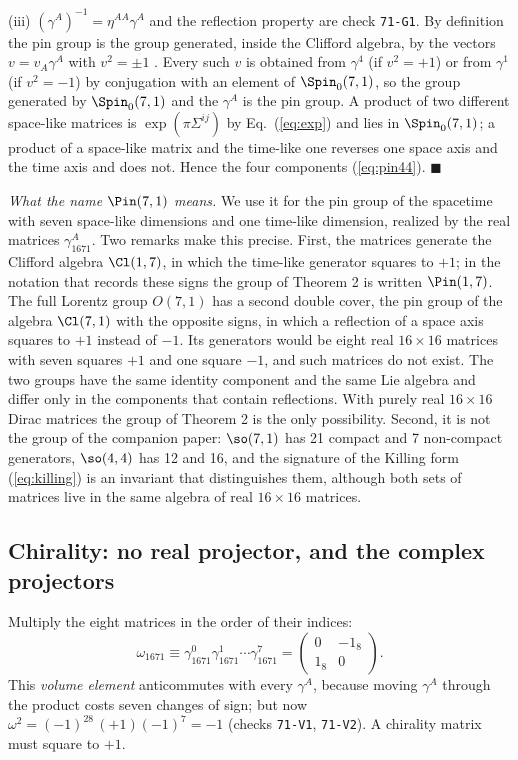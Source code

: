 (iii) $(\gamma^A)^{-1}=\eta^{AA}\gamma^A$ and the reflection property are check \texttt{71-G1}. By
definition the pin group is the group generated, inside the Clifford algebra, by the vectors
$v=v_A\gamma^A$ with $v^2=\pm1$ \cite{AtiyahBottShapiro1964,LawsonMichelsohn1989}. Every such $v$ is
obtained from $\gamma^4$ (if $v^2=+1$) or from $\gamma^1$ (if $v^2=-1$) by conjugation with an element
of $\Spin_0(7,1)$, so the group generated by $\Spin_0(7,1)$ and the $\gamma^A$ is the pin group. A
product of two different space-like matrices is $\exp(\pi\Sigma^{ij})$ by Eq.~(\ref{eq:exp}) and lies
in $\Spin_0(7,1)$; a product of a space-like matrix and the time-like one reverses one space axis and
the time axis and does not. Hence the four components (\ref{eq:pin44}). $\blacksquare$

\emph{What the name $\Pin(7,1)$ means.} We use it for the pin group of the spacetime with seven
space-like dimensions and one time-like dimension, realized by the real matrices $\gamma_{1671}^A$.
Two remarks make this precise. First, the matrices generate the Clifford algebra $\Cl(1,7)$, in which
the time-like generator squares to $+1$; in the notation that records these signs the group of
Theorem 2 is written $\Pin(1,7)$. The full Lorentz group $O(7,1)$ has a second double cover, the pin
group of the algebra $\Cl(7,1)$ with the opposite signs, in which a reflection of a space axis squares
to $+1$ instead of $-1$. Its generators would be eight real $16\times16$ matrices with seven squares
$+1$ and one square $-1$, and such matrices do not exist. The two groups have the same identity
component and the same Lie algebra and differ only in the components that contain reflections. With
purely real $16\times16$ Dirac matrices the group of Theorem 2 is the only possibility. Second, it is
not the group of the companion paper: $\so(7,1)$ has 21 compact and 7 non-compact generators,
$\so(4,4)$ has 12 and 16, and the signature of the Killing form (\ref{eq:killing}) is an invariant
that distinguishes them, although both sets of matrices live in the same algebra of real
$16\times16$ matrices.

\subsection{Chirality: no real projector, and the complex projectors}
\label{sec:chirality}

Multiply the eight matrices in the order of their indices:
\begin{equation}
\omega_{1671}\equiv\gamma_{1671}^0\gamma_{1671}^1\cdots\gamma_{1671}^7=\begin{pmatrix}0&-1_8\\1_8&0\end{pmatrix}.
\label{eq:omega}
\end{equation}
This \emph{volume element} anticommutes with every $\gamma^A$, because moving $\gamma^A$ through the
product costs seven changes of sign; but now
$\omega^2=(-1)^{28}\,(+1)(-1)^7=-1$ (checks \texttt{71-V1}, \texttt{71-V2}). A chirality matrix must
square to $+1$.

